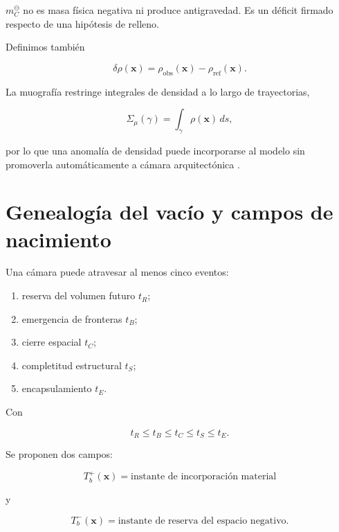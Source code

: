 \(m_C^\ominus\) no es masa física negativa ni produce antigravedad. Es un déficit firmado respecto de una hipótesis de relleno.

Definimos también

\begin{equation}
\delta\rho(\mathbf x)
=
\rho_{\mathrm{obs}}(\mathbf x)
-
\rho_{\mathrm{ref}}(\mathbf x).
\end{equation}

La muografía restringe integrales de densidad a lo largo de trayectorias,

\begin{equation}
\Sigma_\mu(\gamma)
=
\int_\gamma \rho(\mathbf x)\,ds,
\end{equation}

por lo que una anomalía de densidad puede incorporarse al modelo sin promoverla automáticamente a cámara arquitectónica \cite{morishima2017,procureur2023}.

\section{Genealogía del vacío y campos de nacimiento}

Una cámara puede atravesar al menos cinco eventos:

\begin{enumerate}[label=(\roman*)]
\item reserva del volumen futuro \(t_R\);
\item emergencia de fronteras \(t_B\);
\item cierre espacial \(t_C\);
\item completitud estructural \(t_S\);
\item encapsulamiento \(t_E\).
\end{enumerate}

Con

\begin{equation}
t_R\le t_B\le t_C\le t_S\le t_E.
\end{equation}

Se proponen dos campos:

\begin{equation}
\boxed{
T_b^+(\mathbf x)
=
\text{instante de incorporación material}
}
\end{equation}

y

\begin{equation}
\boxed{
T_b^-(\mathbf x)
=
\text{instante de reserva del espacio negativo}.
}
\end{equation}

